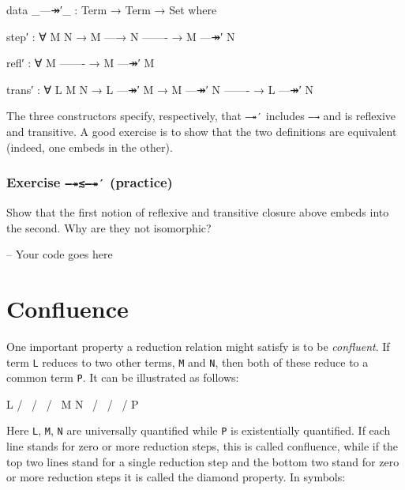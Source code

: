 \begin{fence}
\begin{code}
data _—↠′_ : Term → Term → Set where

  step′ : ∀ {M N}
    → M —→ N
      -------
    → M —↠′ N

  refl′ : ∀ {M}
      -------
    → M —↠′ M

  trans′ : ∀ {L M N}
    → L —↠′ M
    → M —↠′ N
      -------
    → L —↠′ N
\end{code}
\end{fence}

The three constructors specify, respectively, that \texttt{—↠′} includes
\texttt{—→} and is reflexive and transitive. A good exercise is to show
that the two definitions are equivalent (indeed, one embeds in the
other).

\hypertarget{exercise-practice}{%
\subsubsection{\texorpdfstring{Exercise \texttt{—↠≲—↠′}
(practice)}{Exercise ---↠≲---↠′ (practice)}}\label{exercise-practice}}

Show that the first notion of reflexive and transitive closure above
embeds into the second. Why are they not isomorphic?

\begin{fence}
\begin{code}
-- Your code goes here
\end{code}
\end{fence}

\hypertarget{confluence}{%
\section{Confluence}\label{confluence}}

One important property a reduction relation might satisfy is to be
\emph{confluent}. If term \texttt{L} reduces to two other terms,
\texttt{M} and \texttt{N}, then both of these reduce to a common term
\texttt{P}. It can be illustrated as follows:

\begin{myDisplay}
           L
          / \
         /   \
        /     \
       M       N
        \     /
         \   /
          \ /
           P
\end{myDisplay}

Here \texttt{L}, \texttt{M}, \texttt{N} are universally quantified while
\texttt{P} is existentially quantified. If each line stands for zero or
more reduction steps, this is called confluence, while if the top two
lines stand for a single reduction step and the bottom two stand for
zero or more reduction steps it is called the diamond property. In
symbols:

